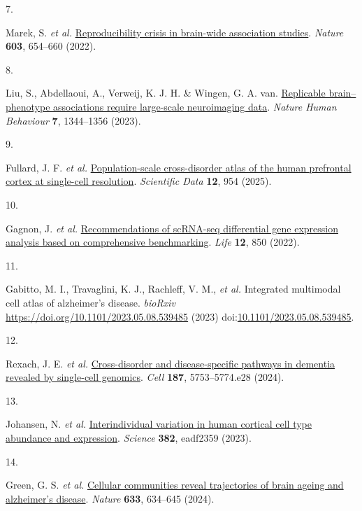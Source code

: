 \documentclass[
]{article}
\newlength{\cslhangindent}
\newlength{\csllabelwidth}
\newenvironment{CSLReferences}[2] %
 {\begin{list}{}{%
  \setlength{\itemindent}{0pt}
  \setlength{\leftmargin}{0pt}
  \setlength{\parsep}{0pt}
  \ifodd #1
   \setlength{\leftmargin}{\cslhangindent}
   \setlength{\itemindent}{-1\cslhangindent}
  \fi
  \setlength{\itemsep}{#2\baselineskip}}}
 {\end{list}}
\newcommand{\CSLLeftMargin}[1]{\parbox[t]{\csllabelwidth}{\strut#1\strut}}
\newcommand{\CSLRightInline}[1]{\parbox[t]{\linewidth - \csllabelwidth}{\strut#1\strut}}
\begin{document}
\begin{CSLReferences}{0}{0}
\CSLLeftMargin{7. }%
\CSLRightInline{Marek, S. \emph{et al.}
\href{https://doi.org/10.1038/s41586-022-04492-9}{Reproducibility crisis
in brain-wide association studies}. \emph{Nature} \textbf{603}, 654--660
(2022).}

\CSLLeftMargin{8. }%
\CSLRightInline{Liu, S., Abdellaoui, A., Verweij, K. J. H. \& Wingen, G.
A. van. \href{https://doi.org/10.1038/s41562-023-01642-5}{Replicable
brain--phenotype associations require large-scale neuroimaging data}.
\emph{Nature Human Behaviour} \textbf{7}, 1344--1356 (2023).}

\CSLLeftMargin{9. }%
\CSLRightInline{Fullard, J. F. \emph{et al.}
\href{https://doi.org/10.1038/s41597-025-04687-5}{Population-scale
cross-disorder atlas of the human prefrontal cortex at single-cell
resolution}. \emph{Scientific Data} \textbf{12}, 954 (2025).}

\CSLLeftMargin{10. }%
\CSLRightInline{Gagnon, J. \emph{et al.}
\href{https://doi.org/10.3390/life12060850}{Recommendations of
{scRNA}-seq differential gene expression analysis based on comprehensive
benchmarking}. \emph{Life} \textbf{12}, 850 (2022).}

\CSLLeftMargin{11. }%
\CSLRightInline{Gabitto, M. I., Travaglini, K. J., Rachleff, V. M.,
\emph{et al.} Integrated multimodal cell atlas of alzheimer's disease.
\emph{bioRxiv} \url{https://doi.org/10.1101/2023.05.08.539485} (2023)
doi:\href{https://doi.org/10.1101/2023.05.08.539485}{10.1101/2023.05.08.539485}.}

\CSLLeftMargin{12. }%
\CSLRightInline{Rexach, J. E. \emph{et al.}
\href{https://doi.org/10.1016/j.cell.2024.08.019}{Cross-disorder and
disease-specific pathways in dementia revealed by single-cell genomics}.
\emph{Cell} \textbf{187}, 5753--5774.e28 (2024).}

\CSLLeftMargin{13. }%
\CSLRightInline{Johansen, N. \emph{et al.}
\href{https://doi.org/10.1126/science.adf2359}{Interindividual variation
in human cortical cell type abundance and expression}. \emph{Science}
\textbf{382}, eadf2359 (2023).}

\CSLLeftMargin{14. }%
\CSLRightInline{Green, G. S. \emph{et al.}
\href{https://doi.org/10.1038/s41586-024-07871-6}{Cellular communities
reveal trajectories of brain ageing and alzheimer's disease}.
\emph{Nature} \textbf{633}, 634--645 (2024).}


\end{CSLReferences}
\end{document}
